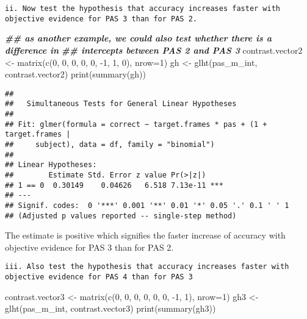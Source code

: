 \documentclass[
]{article}
\newenvironment{Shaded}{\begin{snugshade}}{\end{snugshade}}
\newcommand{\AttributeTok}[1]{\textcolor[rgb]{0.77,0.63,0.00}{#1}}
\newcommand{\DecValTok}[1]{\textcolor[rgb]{0.00,0.00,0.81}{#1}}
\newcommand{\DocumentationTok}[1]{\textcolor[rgb]{0.56,0.35,0.01}{\textbf{\textit{#1}}}}
\newcommand{\FunctionTok}[1]{\textcolor[rgb]{0.00,0.00,0.00}{#1}}
\newcommand{\NormalTok}[1]{#1}
\newcommand{\OtherTok}[1]{\textcolor[rgb]{0.56,0.35,0.01}{#1}}
\newcommand{\SpecialCharTok}[1]{\textcolor[rgb]{0.00,0.00,0.00}{#1}}
\begin{document}
\begin{verbatim}
ii. Now test the hypothesis that accuracy increases faster with objective evidence for PAS 3 than for PAS 2.
\end{verbatim}

\begin{Shaded}
\begin{Highlighting}[]
\DocumentationTok{\#\# as another example, we could also test whether there is a difference in}
\DocumentationTok{\#\# intercepts between PAS 2 and PAS 3}
\NormalTok{contrast.vector2 }\OtherTok{\textless{}{-}} \FunctionTok{matrix}\NormalTok{(}\FunctionTok{c}\NormalTok{(}\DecValTok{0}\NormalTok{, }\DecValTok{0}\NormalTok{, }\DecValTok{0}\NormalTok{, }\DecValTok{0}\NormalTok{, }\DecValTok{0}\NormalTok{, }\SpecialCharTok{{-}}\DecValTok{1}\NormalTok{, }\DecValTok{1}\NormalTok{, }\DecValTok{0}\NormalTok{), }\AttributeTok{nrow=}\DecValTok{1}\NormalTok{)}
\NormalTok{gh }\OtherTok{\textless{}{-}} \FunctionTok{glht}\NormalTok{(pas\_m\_int, contrast.vector2)}
\FunctionTok{print}\NormalTok{(}\FunctionTok{summary}\NormalTok{(gh))}
\end{Highlighting}
\end{Shaded}

\begin{verbatim}
## 
##   Simultaneous Tests for General Linear Hypotheses
## 
## Fit: glmer(formula = correct ~ target.frames * pas + (1 + target.frames | 
##     subject), data = df, family = "binomial")
## 
## Linear Hypotheses:
##        Estimate Std. Error z value Pr(>|z|)    
## 1 == 0  0.30149    0.04626   6.518 7.13e-11 ***
## ---
## Signif. codes:  0 '***' 0.001 '**' 0.01 '*' 0.05 '.' 0.1 ' ' 1
## (Adjusted p values reported -- single-step method)
\end{verbatim}

The estimate is positive which signifies the faster increase of accuracy
with objective evidence for PAS 3 than for PAS 2.

\begin{verbatim}
iii. Also test the hypothesis that accuracy increases faster with objective evidence for PAS 4 than for PAS 3
\end{verbatim}

\begin{Shaded}
\begin{Highlighting}[]
\NormalTok{contrast.vector3 }\OtherTok{\textless{}{-}} \FunctionTok{matrix}\NormalTok{(}\FunctionTok{c}\NormalTok{(}\DecValTok{0}\NormalTok{, }\DecValTok{0}\NormalTok{, }\DecValTok{0}\NormalTok{, }\DecValTok{0}\NormalTok{, }\DecValTok{0}\NormalTok{, }\DecValTok{0}\NormalTok{, }\SpecialCharTok{{-}}\DecValTok{1}\NormalTok{, }\DecValTok{1}\NormalTok{), }\AttributeTok{nrow=}\DecValTok{1}\NormalTok{)}
\NormalTok{gh3 }\OtherTok{\textless{}{-}} \FunctionTok{glht}\NormalTok{(pas\_m\_int, contrast.vector3)}
\FunctionTok{print}\NormalTok{(}\FunctionTok{summary}\NormalTok{(gh3))}
\end{Highlighting}
\end{Shaded}
\end{document}
